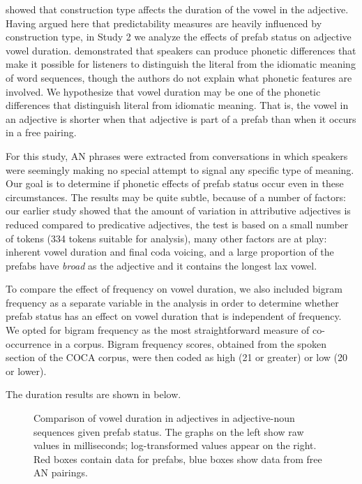 \documentclass[output=paper]{langscibook}
\begin{document}
\citet{BybeeSouza2019} showed that construction type affects the duration of the vowel in the adjective. Having argued here that predictability measures are heavily influenced by construction type, in Study 2 we analyze the effects of prefab status on adjective vowel duration.  \citet{VanLanckerCanter1981} demonstrated that speakers can produce phonetic differences that make it possible for listeners to distinguish the literal from the idiomatic meaning of word sequences, though the authors do not explain what phonetic features are involved. We hypothesize that vowel duration may be one of the phonetic differences that distinguish literal from idiomatic meaning. That is, the vowel in an adjective is shorter when that adjective is part of a prefab than when it occurs in a free pairing. 

For this study, AN phrases were extracted from conversations in which speakers were seemingly making no special attempt to signal any specific type of meaning. Our goal is to determine if phonetic effects of prefab status occur even in these circumstances. The results may be quite subtle, because of a number of factors:  our earlier study showed that the amount of variation in attributive adjectives is reduced compared to predicative adjectives,  the test is based on a small number of tokens (334 tokens suitable for analysis),  many other factors are at play: inherent vowel duration and final coda voicing, and  a large proportion of the prefabs have \textit{broad} as the adjective and it contains the longest lax vowel.

To compare the effect of frequency on vowel duration, we also included bigram frequency as a separate variable in the analysis in order to determine whether prefab status has an effect on vowel duration that is independent of frequency. We opted for bigram frequency as the most straightforward measure of co-occurrence in a corpus. Bigram frequency scores, obtained from the spoken section of the COCA corpus, were then coded as high (21 or greater) or low (20 or lower).

The duration results are shown in  below.

\begin{figure}
\caption{\label{fig:bybee:1}Comparison of vowel duration in adjectives in adjective-noun sequences given prefab status. The graphs on the left show raw values in milliseconds; log-transformed values appear on the right. Red boxes contain data for prefabs, blue boxes show data from free AN pairings.}
\end{figure}
\end{document}
